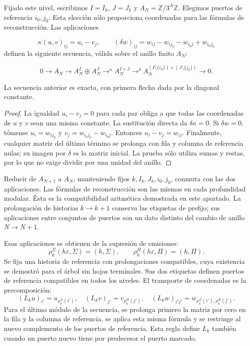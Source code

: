 Fijado este nivel, escribimos \(I=I_k\), \(J=J_k\) y \(A_N=\mathbb Z/3^N\mathbb Z\). Elegimos puertos de referencia \(i_0,j_0\). Esta elección sólo proporciona coordenadas para las fórmulas de reconstrucción. Las aplicaciones

\[
\kappa(u,v)_{ij}=u_i-v_j,
\qquad
(\delta w)_{ij}=w_{ij}-w_{ij_0}-w_{i_0j}+w_{i_0j_0}
\]
definen la siguiente secuencia, válida sobre el anillo finito \(A_N\):

\[
0\longrightarrow A_N\longrightarrow
A_N^I\oplus A_N^J\mathrel{\mathop{\longrightarrow}^{\kappa}}
A_N^{I\times J}\mathrel{\mathop{\longrightarrow}^{\delta}}
A_N^{(I\setminus\{i_0\})\times(J\setminus\{j_0\})}
\longrightarrow0.
\]
\begin{proposition}
\label{iv:cont:rectangular-exacta}
La secuencia anterior es exacta, con primera flecha dada por la diagonal constante.

\end{proposition}
\begin{proof}
La igualdad \(u_i-v_j=0\) para cada par obliga a que todas las coordenadas de \(u\) y \(v\) sean una misma constante. La sustitución directa da \(\delta\kappa=0\). Si \(\delta w=0\), tómense \(u_i=w_{ij_0}\) y \(v_j=w_{i_0j_0}-w_{i_0j}\). Entonces \(u_i-v_j=w_{ij}\). Finalmente, cualquier matriz del último término se prolonga con fila y columna de referencia nulas; su imagen por \(\delta\) es la matriz inicial. La prueba sólo utiliza sumas y restas, por lo que no exige dividir por una unidad del anillo.
\end{proof}

Reducir de \(A_{N+1}\) a \(A_N\), manteniendo fijos \(k,I_k,J_k,i_0,j_0\), conmuta con las dos aplicaciones. Las fórmulas de reconstrucción son las mismas en cada profundidad modular. Ésta es la compatibilidad aritmética demostrada en este apartado. La prolongación de historias \(k\to k+1\) conserva las etiquetas de prefijo; sus aplicaciones entre conjuntos de puertos son un dato distinto del cambio de anillo \(N\to N+1\).

Esas aplicaciones se obtienen de la supresión de emisiones:
\[
\rho_k^\Sigma(h\varepsilon,\Sigma)=(h,\Sigma),\qquad
\rho_k^\Pi(h\varepsilon,\Pi)=(h,\Pi).
\]
Se fija una historia de referencia con prolongaciones compatibles, cuya existencia se demostró para el árbol sin hojas terminales. Sus dos etiquetas definen puertos de referencia compatibles en todos los niveles. El transporte de coordenadas es la precomposición:
\[
(L_ku)_{i'}=u_{\rho_k^\Sigma(i')},\quad
(L_kv)_{j'}=v_{\rho_k^\Pi(j')},\quad
(L_kw)_{i'j'}=w_{\rho_k^\Sigma(i'),\rho_k^\Pi(j')}.
\]
Para el último módulo de la secuencia, se prolonga primero la matriz por cero en la fila y la columna de referencia, se aplica esta misma fórmula y se restringe al nuevo complemento de los puertos de referencia. Esta regla define \(L_k\) también cuando un puerto nuevo tiene por predecesor el puerto marcado.

